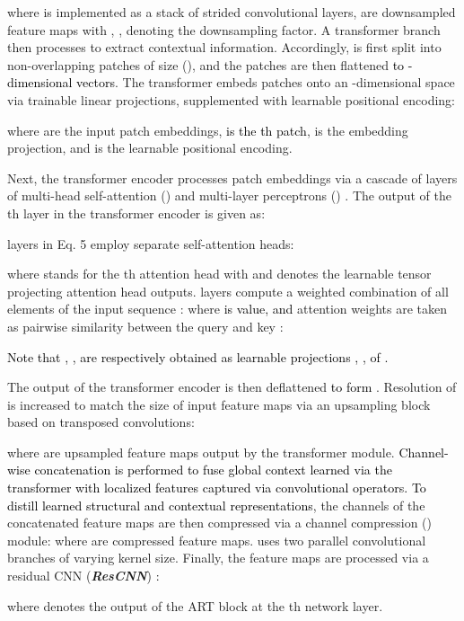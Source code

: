 \documentclass[journal,twoside,web]{ieeecolor}
\newcommand*{\revhl}{\textcolor{black}}
\begin{document}
where  is implemented as a stack of strided convolutional layers,  are downsampled feature maps with , ,  denoting the downsampling factor. A transformer branch then processes  to extract contextual information. Accordingly,  is first split into \revhl{} non-overlapping patches of size (), and the patches are then flattened \revhl{to -dimensional vectors}. The transformer embeds patches onto an -dimensional space via trainable linear projections, supplemented with learnable positional encoding: 

where  are the input patch embeddings, \revhl{ is the th patch},  is the embedding projection, and  is the learnable positional encoding. 

\par Next, the transformer encoder processes patch embeddings via a cascade of  layers of multi-head self-attention () \cite{vaswani2017} and multi-layer perceptrons () \cite{mlp}. The output of the th layer in the transformer encoder is given as:

 layers in Eq. 5 employ  separate self-attention heads:

where  stands for the th attention head with  and  denotes the learnable tensor projecting attention head outputs.  layers compute a weighted combination of all elements of the input sequence :  where \revhl{ is value, and} attention weights  are taken as pairwise similarity between the query  and key :

\revhl{Note that , ,  are respectively obtained as learnable projections , ,  of .}
\par 
The output of the transformer encoder  is then deflattened \revhl{to form}
. Resolution of  is increased to match the size of input feature maps via an upsampling block  based on transposed convolutions:

where  are upsampled feature maps output by the transformer module. \revhl{Channel-wise concatenation is performed to fuse global context learned via the transformer with localized features captured via convolutional operators.}
\revhl{To distill learned structural and contextual representations}, the channels of the concatenated feature maps are then compressed via a channel compression () module:
\revhl{}
where  are compressed feature maps.  uses two parallel convolutional branches of varying kernel size. Finally, the feature maps are processed via a residual CNN (\textit{\textbf{ResCNN}}) \cite{resnet}:

where  denotes the output of the ART block at the th network layer. 
\end{document}
